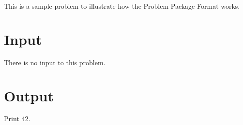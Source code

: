 This is a sample problem to illustrate how the Problem Package Format works.
\section*{Input}
There is no input to this problem.
\section*{Output}
Print 42.

